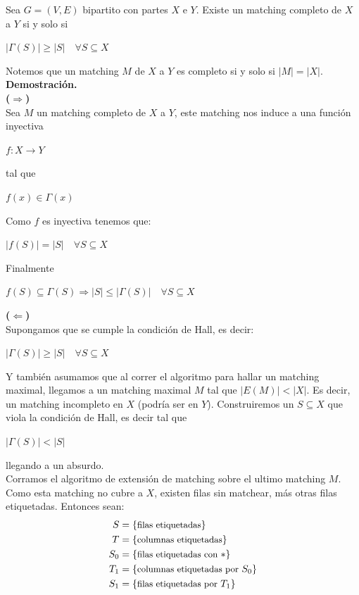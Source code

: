 \documentclass[11pt, a4paper]{article}
\theoremstyle{definition}
\begin{document}
Sea $G=(V,E)$ bipartito con partes $X$ e $Y$. Existe un matching completo de $X$ a $Y$ si y solo si 
\begin{center}
    $|\Gamma(S)| \geq |S| \quad \forall S \subseteq X$
\end{center}
Notemos que un matching $M$ de $X$ a $Y$ es completo si y solo si $|M|=|X|$.
\textbf{Demostración.}\\
\textbf{($\Rightarrow$)}\\  
Sea $M$ un matching completo de $X$ a $Y$, este matching nos induce a una función inyectiva
\begin{center}
    $f: X \rightarrow Y$
\end{center}
tal que 
\begin{center}
    $f(x)\in \Gamma(x)$
\end{center}
Como $f$ es inyectiva tenemos que:
\begin{center}
    $|f(S)|=|S| \quad \forall S \subseteq X$
\end{center}
Finalmente 
\begin{center}
    $f(S) \subseteq \Gamma(S) \Rightarrow |S| \leq |\Gamma(S)| \quad \forall S \subseteq X$
\end{center}
\textbf{($\Leftarrow$)}\\ 
Supongamos que se cumple la condición de Hall, es decir: 
\begin{center}
    $|\Gamma(S)| \geq |S| \quad \forall S \subseteq X$
\end{center}
Y también asumamos que al correr el algoritmo para hallar un matching maximal, llegamos a un matching maximal $M$ tal que
$|E(M)| < |X|$. Es decir, un matching incompleto en $X$ (podría ser en $Y$). Construiremos un $S \subseteq X$ que viola la condición de Hall, es decir tal que
\begin{center}
    $|\Gamma(S)| < |S|$
\end{center}
llegando a un absurdo.\\
Corramos el algoritmo de extensión de matching sobre el ultimo matching $M$. Como esta matching no cubre a $X$, existen filas sin matchear, más otras filas etiquetadas.
Entonces sean:
\begin{align*}
    S & = \{\text{\small filas etiquetadas}\} \\
    T & = \{\text{\small columnas etiquetadas}\} \\
    S_0 & = \{\text{\small filas etiquetadas con }*\} \\
    T_1 & = \{\text{\small columnas etiquetadas por }S_0\} \\
    S_1 & = \{\text{\small filas etiquetadas por } T_1\}
 \end{align*}
\end{document}
